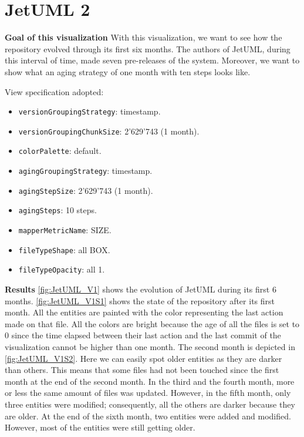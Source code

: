 \clearpage
\section{JetUML 2}
\textbf{Goal of this visualization}
With this visualization, we want to see how the repository evolved through its first six months. 
The authors of JetUML, during this interval of time, made seven pre-releases of the system. 
Moreover, we want to show what an aging strategy of one month with ten steps looks like. 

\bigbreak
View specification adopted: 
\begin{itemize}
    \item \texttt{versionGroupingStrategy}: timestamp.
    \item \texttt{versionGroupingChunkSize}: 2'629'743 (1 month). 
    \item \texttt{colorPalette}: default.
    \item \texttt{agingGroupingStrategy}: timestamp.
    \item \texttt{agingStepSize}: 2'629'743 (1 month).
    \item \texttt{agingSteps}: 10 steps.
    \item \texttt{mapperMetricName}: SIZE. 
    \item \texttt{fileTypeShape}: all BOX. 
    \item \texttt{fileTypeOpacity}: all 1. 
\end{itemize}

\textbf{Results}
\autoref{fig:JetUML_V1} shows the evolution of JetUML during its first 6 months. \autoref{fig:JetUML_V1S1} shows the state of the repository after its first month. All the entities are painted with the color representing the last action made on that file. All the colors are bright because the age of all the files is set to 0 since the time elapsed between their last action and the last commit of the visualization cannot be higher than one month. The second month is depicted in \autoref{fig:JetUML_V1S2}. Here we can easily spot older entities as they are darker than others. This means that some files had not been touched since the first month at the end of the second month. In the third and the fourth month, more or less the same amount of files was updated. However, in the fifth month, only three entities were modified; consequently, all the others are darker because they are older. 
At the end of the sixth month, two entities were added and modified. However, most of the entities were still getting older. 

